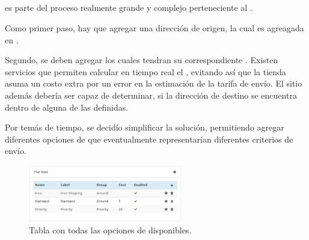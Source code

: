 \subsection{\shippingEF}\label{cap:solucionImplementada:section:}

\shippingEF es parte del proceso realmente grande y complejo perteneciente al \workflowCPT \orderFulfillmentCOM. 

Como primer paso, hay que agregar una dirección de origen, la cual es agreagada en .

Segundo, se deben agregar \shippingZonesCOM los cuales tendran su correspondiente \shippingRatesCOM. Existen servicios que permiten calcular en tiempo real el \shippingRatesCOM, evitando así que la tienda asuma un costo extra por un error en la estimación de la tarifa de envío. El sitio además debería ser capaz de determinar, si la dirección de destino se encuentra dentro de alguna de las \shippingZonesCOM definidas.


Por temás de tiempo, se decidío simplificar la solución, permitiendo agregar diferentes opciones de \shippingEF que eventualmente representarían diferentes criterios de envío.


\begin{figure}[H]
	\centering
	\includegraphics[width=0.6\textwidth]{figuras/dashboard/shipping/shipping_options.png}
	\caption{Tabla con todas las opciones de \shippingEF disponibles.}
	\label{figure:dashboard:shipping:shipping_options}
\end{figure}

